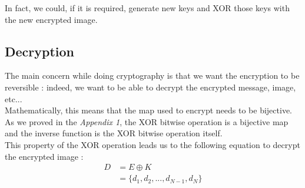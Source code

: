 In fact, we could, if it is required, generate new keys and XOR those keys with the new encrypted image.

\subsection{Decryption}
The main concern while doing cryptography is that we want the encryption to be reversible : indeed, we want to be able to decrypt the encrypted message, image, etc... \\
Mathematically, this means that the map used to encrypt needs to be bijective.
As we proved in the \textit{Appendix 1}, the XOR bitwise operation is a bijective map and the inverse function is the XOR bitwise operation itself. \\
This property of the XOR operation leads us to the following equation to decrypt the encrypted image :
\vspace{-0.4em}
\begin{align*}
	D &= E \oplus K \\
	&= \{d_1, d_2, ..., d_{N-1}, d_N\}
\end{align*}

